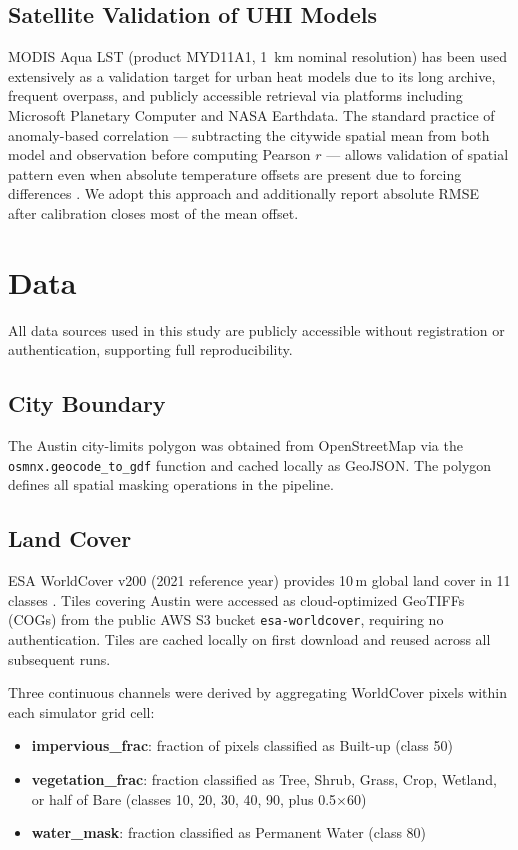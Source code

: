 \documentclass[12pt, letterpaper]{article}
\begin{document}
\subsection{Satellite Validation of UHI Models}

MODIS Aqua LST (product MYD11A1, \SI{1}{\km} nominal resolution) has been
used extensively as a validation target for urban heat models due to its
long archive, frequent overpass, and publicly accessible retrieval via
platforms including Microsoft Planetary Computer and NASA Earthdata. The
standard practice of anomaly-based correlation — subtracting the citywide
spatial mean from both model and observation before computing Pearson $r$ —
allows validation of spatial pattern even when absolute temperature offsets
are present due to forcing differences \citep{mitraka2025prototypes}.
We adopt this approach and additionally report absolute RMSE after calibration
closes most of the mean offset.

\section{Data}
\label{sec:data}

All data sources used in this study are publicly accessible without
registration or authentication, supporting full reproducibility.

\subsection{City Boundary}
The Austin city-limits polygon was obtained from OpenStreetMap via the
\texttt{osmnx.geocode\_to\_gdf} function and cached locally as GeoJSON.
The polygon defines all spatial masking operations in the pipeline.

\subsection{Land Cover}
ESA WorldCover v200 (2021 reference year) provides 10\,m global land cover
in 11 classes \citep{zanaga2022esa}. Tiles covering Austin were accessed
as cloud-optimized GeoTIFFs (COGs) from the public AWS S3 bucket
\texttt{esa-worldcover}, requiring no authentication. Tiles are cached
locally on first download and reused across all subsequent runs.

Three continuous channels were derived by aggregating WorldCover pixels
within each simulator grid cell:
\begin{itemize}[noitemsep]
  \item \textbf{impervious\_frac}: fraction of pixels classified as
        Built-up (class 50)
  \item \textbf{vegetation\_frac}: fraction classified as Tree, Shrub,
        Grass, Crop, Wetland, or half of Bare (classes 10, 20, 30, 40, 90,
        plus 0.5$\times$60)
  \item \textbf{water\_mask}: fraction classified as Permanent Water
        (class 80)
\end{itemize}
\end{document}
